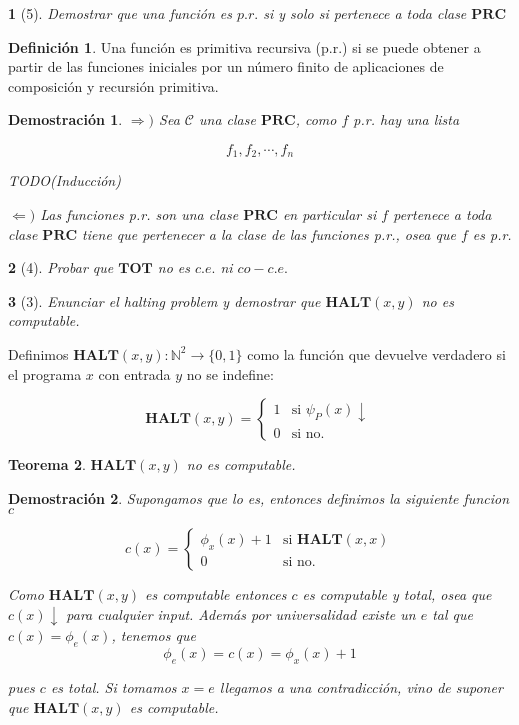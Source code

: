 \documentclass[leqno, 12pt, twoside,letterpaper]{book}
\theoremstyle{plain}
\newtheorem{thm}{Teorema}[chapter]
\newtheorem*{dem}{Demostración}
\newtheorem{ej}{}
\theoremstyle{definition}
\newtheorem{defi}[thm]{Definición}
\newcommand{\naturals}[0]{\mathbb{N}}
\newcommand{\class}[1][\mathcal]{#1}
\newcommand{\PRC}[0]{\bm{PRC}}
\newcommand{\HALT}[2]{\bm{HALT}(#1, #2)}
\newcommand{\func}[3]{#1 \colon #2 \to #3}
\newcommand{\twopartdef}[4]
{
	\left\{
		\begin{array}{ll}
			#1 & \mbox{si } #2 \\
			#3 & \mbox{} #4
		\end{array}
	\right.
}
\begin{document}
\begin{ej}[5]
    Demostrar que una función es $p.r.$ si y solo si pertenece a toda clase
    $\PRC$
\end{ej}

\begin{defi} Una función es primitiva recursiva (p.r.) si se puede obtener a partir de las funciones iniciales por un número finito de aplicaciones de composición y recursión primitiva.
\end{defi}

\begin{dem}
$\Rightarrow)$ Sea $\class{C}$ una clase $\PRC$, como $f$ p.r. hay una lista

	\[ f_1, f_2, \cdots, f_n \] 
	
	TODO(Inducción) 
	
\noindent $\Leftarrow)$ Las funciones p.r. son una clase $\PRC$ en particular si $f$ pertenece a toda clase $\PRC$ tiene que pertenecer a la clase de las funciones p.r., osea que $f$ es p.r.
\end{dem}


\begin{ej}[4]
    Probar que $\bm{TOT}$ no es $c.e.$ ni $co-c.e.$
\end{ej}

\begin{ej}[3]
    Enunciar el halting problem y demostrar que $\HALT{x}{y}$ no es computable.
\end{ej}


\noindent Definimos $\func{\HALT{x}{y}}{\naturals^2}{\{0, 1\}} $ como la función que devuelve verdadero si el programa $x$ con entrada $y$ no se indefine:
	
	\[ \HALT{x}{y} = \twopartdef{1}{\psi_{P}(x) \downarrow}{0}{\mbox{si no.}}\]
	
\begin{thm} $\HALT{x}{y}$ no es computable.
\end{thm}
\begin{dem}
	Supongamos que lo es, entonces definimos la siguiente funcion $c$
	
	\[ c(x) = \twopartdef{\phi_x{(x)} + 1}{\HALT{x}{x}}{0}{\mbox{si no.}} \]
	
	\noindent Como $\HALT{x}{y}$ es computable entonces $c$ es computable y total, osea que $c(x) \downarrow$ para cualquier input. Además por universalidad existe un $e$ tal que $c(x) = \phi_{e}(x)$, tenemos que
	\[ \phi_{e}(x) = c(x) = \phi_{x}(x) + 1 \]
	
	\noindent pues $c$ es total. Si tomamos $x = e$ llegamos a una contradicción, vino de suponer que $\HALT{x}{y}$ es computable.
\end{dem}
\end{document}
